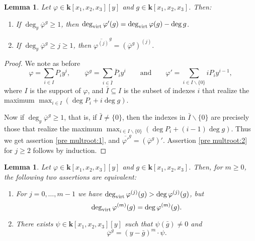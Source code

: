 \documentclass[reqno,oneside,11pt]{amsart}
\theoremstyle{plain}
\newtheorem{lemma}[theorem]{Lemma}
\theoremstyle{definition}
\newcommand{\K}{\mathbf{k}}
\renewcommand{\phi}{\varphi}
\newcommand{\dvirt}{\deg_{\text{\rm virt}}}
\newcommand{\topcomp}[2]{\overline{#1}^{#2}}
\renewcommand{\ge}{\geqslant}
\begin{document}
\begin{lemma} \label{lem:pre multroot}
Let $\phi \in \K[x_1, x_2, x_3][y]$ and $g \in \K[x_1,x_2,x_3]$.
Then:
\begin{enumerate}
\item \label{pre multroot:1} If $\deg_y \topcomp{\phi}{g} \ge 1$, then $\dvirt
\phi'(g) = \dvirt \phi(g) - \deg g$.

\item \label{pre multroot:2} If $\deg_y \topcomp{\phi}{g} \ge j \ge 1$,
then $\topcomp{\phi^{(j)}}{g} = (\topcomp{\phi}{g})^{(j)}.$
\end{enumerate}
\end{lemma}

\begin{proof}
We note as before
\begin{equation*}
\phi = \sum_{i \in I} P_i y^i,
\qquad \topcomp{\phi}{g} = \sum_{i \in \bar I} \bar P_i y^i
\qquad \text{and} \qquad \phi' = \sum_{i \in I \smallsetminus \{0\}} iP_i y^{i-1},
\end{equation*}
where $I$ is the support of $\phi$, and $\bar I \subseteq I$ is the subset of
indexes $i$ that realize the maximum $\max_{i \in I} (\deg P_i + i \deg g).$

Now if $\deg_y \topcomp{\phi}{g} \ge 1$, that is, if $\bar I \neq \{0\}$, then
the indexes in $\bar I \smallsetminus \{0\}$ are precisely those that realize
the maximum
$\max_{i \in I \smallsetminus \{0\}} (\deg P_i + (i-1) \deg g).$
Thus we get assertion \ref{pre multroot:1},
and $\topcomp{\phi'}{g} = (\topcomp{\phi}{g})'.$
Assertion \ref{pre multroot:2} for $j \ge 2$ follows by induction.
\end{proof}


\begin{lemma} \label{lem:multroot}
Let $\phi \in \K[x_1, x_2, x_3][y]$ and $g \in \K[x_1,x_2,x_3]$.
Then, for $m \ge 0$, the following two assertions are equivalent:
\begin{enumerate}
\item \label{multroot:1} For $j = 0, \dots, m-1$ we have $\dvirt \phi^{(j)}(g)
> \deg \phi^{(j)}(g)$, but
$$\dvirt \phi^{(m)}(g) = \deg \phi^{(m)}(g).$$
\item \label{multroot:2} There exists $\psi \in \K[x_1, x_2, x_3][y]$ such that $\psi(\bar g) \neq 0$ and
$$\topcomp{\phi}{g} = (y - \bar g)^m \cdot \psi.$$
\end{enumerate}
\end{lemma}
\end{document}
